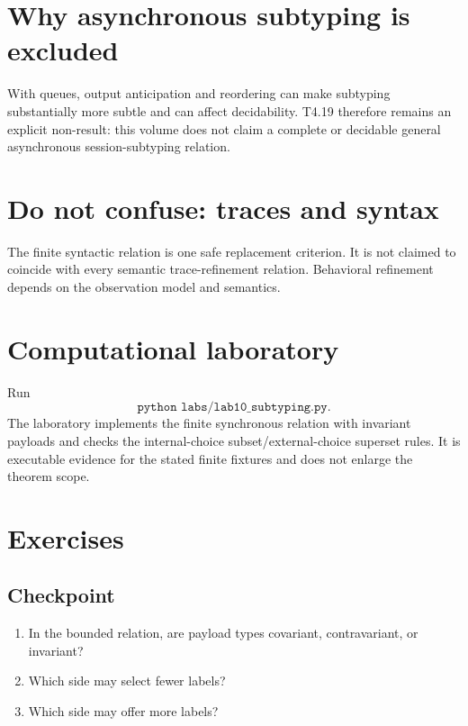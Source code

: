 

\section{Why asynchronous subtyping is excluded}
With queues, output anticipation and reordering can make subtyping substantially more subtle and can affect decidability. T4.19 therefore remains an explicit non-result: this volume does not claim a complete or decidable general asynchronous session-subtyping relation.

\section{Do not confuse: traces and syntax}
\begin{warningbox}
The finite syntactic relation is one safe replacement criterion. It is not claimed to coincide with every semantic trace-refinement relation. Behavioral refinement depends on the observation model and semantics.
\end{warningbox}



\section{Computational laboratory}
\begin{labbox}
Run
\[
  \texttt{python labs/lab10_subtyping.py}.
\]
The laboratory implements the finite synchronous relation with invariant payloads and checks the internal-choice subset/external-choice superset rules. It is executable evidence for the stated finite fixtures and does not enlarge the theorem scope.
\end{labbox}

\section{Exercises}
\subsection*{Checkpoint}
\begin{enumerate}[label=\textbf{10.\arabic*},start=1]
\item In the bounded relation, are payload types covariant, contravariant, or invariant?
\item Which side may select fewer labels?
\item Which side may offer more labels?
\end{enumerate}
